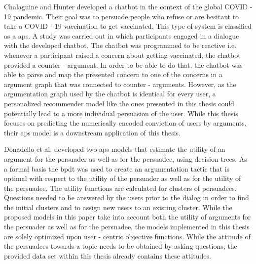 Chalaguine and Hunter \cite{chalaguine2021addressing} developed a chatbot in the context of the global COVID - 19 pandemic. Their goal was to persuade people who refuse or are hesitant to take a COVID - 19 vaccination to get vaccinated. This type of system is classified as a \acrfull{aps}. A study was carried out in which participants engaged in a dialogue with the developed chatbot. The chatbot was programmed to be reactive i.e. whenever a participant raised a concern about getting vaccinated, the chatbot provided a counter - argument. In order to be able to do that, the chatbot was able to parse and map the presented concern to one of the concerns in a argument graph that was connected to counter - arguments. However, as the argumentation graph used by the chatbot is identical for every user, a personalized recommender model like the ones presented in this thesis could potentially lead to a more individual persuasion of the user. While this thesis focuses on predicting the numerically encoded conviction of users by arguments, their \acrshort{aps} model is a downstream application of this thesis.

Donadello et al. \cite{donadello2021machine} developed two \acrshort{aps} models that estimate the utility of an argument for the persuader as well as for the persuadee, using decision trees. As a formal basis the \acrfull{bpdt} \cite{hadoux2018biparty} was used to create an argumentation tactic that is optimal with respect to the utility of the persuader as well as for the utility of the persuadee. The utility functions are calculated for clusters of persuadees. Questions needed to be answered by the users prior to the dialog in order to find the initial clusters and to assign new users to an existing cluster. While the proposed models in this paper take into account both the utility of arguments for the persuader as well as for the persuadee, the models implemented in this thesis are solely optimized upon user - centric objective functions. While the attitude of the persuadees towards a topic needs to be obtained by asking questions, the provided data set within this thesis already contains these attitudes. 

